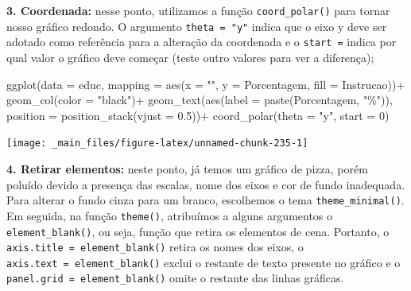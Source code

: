 \documentclass[
  brazilian,
]{book}
\newenvironment{Shaded}{\begin{snugshade}}{\end{snugshade}}
\newcommand{\AttributeTok}[1]{\textcolor[rgb]{0.77,0.63,0.00}{#1}}
\newcommand{\DecValTok}[1]{\textcolor[rgb]{0.00,0.00,0.81}{#1}}
\newcommand{\FloatTok}[1]{\textcolor[rgb]{0.00,0.00,0.81}{#1}}
\newcommand{\FunctionTok}[1]{\textcolor[rgb]{0.00,0.00,0.00}{#1}}
\newcommand{\NormalTok}[1]{#1}
\newcommand{\SpecialCharTok}[1]{\textcolor[rgb]{0.00,0.00,0.00}{#1}}
\newcommand{\StringTok}[1]{\textcolor[rgb]{0.31,0.60,0.02}{#1}}
\begin{document}
\textbf{3. Coordenada:} nesse ponto, utilizamos a função \texttt{coord\_polar()} para tornar nosso gráfico redondo. O argumento \texttt{theta\ =\ "y"} indica que o eixo y deve ser adotado como referência para a alteração da coordenada e o \texttt{start\ =} indica por qual valor o gráfico deve começar (teste outro valores para ver a diferença);

\begin{Shaded}
\begin{Highlighting}[]
\FunctionTok{ggplot}\NormalTok{(}\AttributeTok{data =}\NormalTok{ educ,}
       \AttributeTok{mapping =} \FunctionTok{aes}\NormalTok{(}\AttributeTok{x =} \StringTok{""}\NormalTok{,}
                     \AttributeTok{y =}\NormalTok{ Porcentagem,}
                     \AttributeTok{fill =}\NormalTok{ Instrucao))}\SpecialCharTok{+}
  \FunctionTok{geom\_col}\NormalTok{(}\AttributeTok{color =} \StringTok{"black"}\NormalTok{)}\SpecialCharTok{+}
  \FunctionTok{geom\_text}\NormalTok{(}\FunctionTok{aes}\NormalTok{(}\AttributeTok{label =} \FunctionTok{paste}\NormalTok{(Porcentagem, }\StringTok{"\%"}\NormalTok{)),}
            \AttributeTok{position =} \FunctionTok{position\_stack}\NormalTok{(}\AttributeTok{vjust =} \FloatTok{0.5}\NormalTok{))}\SpecialCharTok{+}
  \FunctionTok{coord\_polar}\NormalTok{(}\AttributeTok{theta =} \StringTok{"y"}\NormalTok{,}
              \AttributeTok{start =} \DecValTok{0}\NormalTok{)}
\end{Highlighting}
\end{Shaded}

\begin{center}\texttt{[image: \_main\_files/figure-latex/unnamed-chunk-235-1]} \end{center}

\textbf{4. Retirar elementos:} neste ponto, já temos um gráfico de pizza, porém poluído devido a presença das escalas, nome dos eixos e cor de fundo inadequada. Para alterar o fundo cinza para um branco, escolhemos o tema \texttt{theme\_minimal()}. Em seguida, na função \texttt{theme()}, atribuímos a alguns argumentos o \texttt{element\_blank()}, ou seja, função que retira os elementos de cena. Portanto, o \texttt{axis.title\ =\ element\_blank()} retira os nomes dos eixos, o \texttt{axis.text\ =\ element\_blank()} exclui o restante de texto presente no gráfico e o \texttt{panel.grid\ =\ element\_blank()} omite o restante das linhas gráficas.
\end{document}
